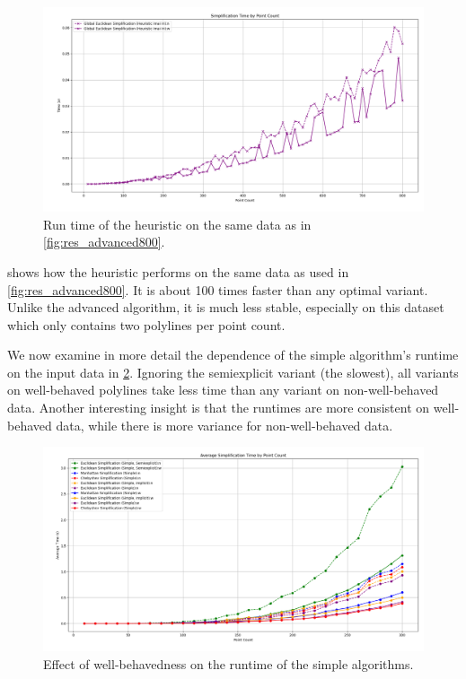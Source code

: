\begin{figure}[b]
  \centering
	\includegraphics[scale=0.4]{./figures/res_heuristic_runtime.png}
	\caption{Run time of the heuristic on the same data as in \cref{fig:res_advanced800}.}
  \label{fig:res_heuristic}
\end{figure}

 shows how the heuristic performs on the same data as used in \cref{fig:res_advanced800}. It is about 100 times faster than any optimal variant. Unlike the advanced algorithm, it is much less stable, especially on this dataset which only contains two polylines per point count.

We now examine in more detail the dependence of the simple algorithm's runtime on the input data in \cref{fig:res_simple}. Ignoring the semiexplicit variant (the slowest), all variants on well-behaved polylines take less time than any variant on non-well-behaved data. Another interesting insight is that the runtimes are more consistent on well-behaved data, while there is more variance for non-well-behaved data.

\begin{figure}[b]
  \centering
	\includegraphics[scale=0.4]{./figures/res_simple.png}
  \caption{Effect of well-behavedness on the runtime of the simple algorithms.}
  \label{fig:res_simple}
\end{figure}

